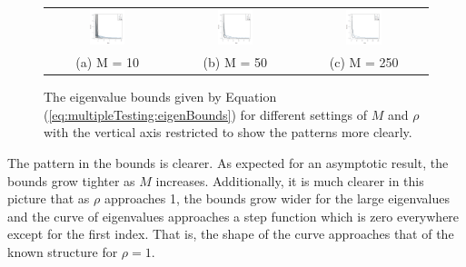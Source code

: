 \documentclass[letterpaper,12pt,oneside,final]{article}
\begin{document}
\begin{figure}[htp]
\begin{center}
\begin{tabular}{ccc}
\includegraphics[width = 0.30\textwidth]{./img/m10eigBoundsZoom.png} &
\includegraphics[width = 0.30\textwidth]{./img/m50eigBoundsZoom.png} &
\includegraphics[width = 0.30\textwidth]{./img/m250eigBoundsZoom.png}
\\
{\footnotesize  (a) M = 10 } &  
{\footnotesize  (b) M = 50 }&
{\footnotesize  (c) M = 250 }
\end{tabular}
\end{center}
\caption{The eigenvalue bounds given by Equation (\ref{eq:multipleTesting:eigenBounds}) for different settings of $M$ and $\rho$ with the vertical axis restricted to show the patterns more clearly.}
\label{fig:multipleTesting:eigBoundsZoom}
\end{figure}
The pattern in the bounds is clearer. As expected for an asymptotic result, the bounds grow tighter as $M$ increases. Additionally, it is much clearer in this picture that as $\rho$ approaches 1, the bounds grow wider for the large eigenvalues and the curve of eigenvalues approaches a step function which is zero everywhere except for the first index. That is, the shape of the curve approaches that of the known structure for $\rho = 1$.
\end{document}
